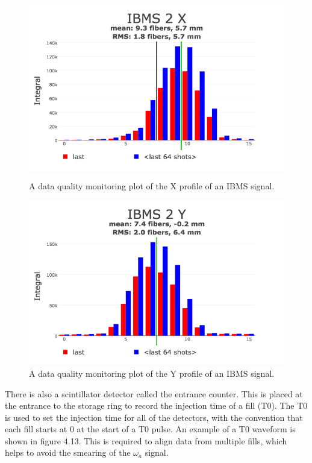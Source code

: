\begin{figure}[!h]
	\centering
	\begin{minipage}[t]{11cm}
		\centering
		\includegraphics[scale=0.5]{Figures/IBMS2_X_DQM.png}
		\caption{A data quality monitoring plot of the X profile of an IBMS signal.}
	\end{minipage}
	\hspace{3cm}
	\begin{minipage}[t]{11cm}
		\centering
		\includegraphics[scale=0.5]{Figures/IBMS2_Y_DQM.png}
		\caption{A data quality monitoring plot of the Y profile of an IBMS signal.}
	\end{minipage}
	\end{figure}

There is also a scintillator detector called the entrance counter. This is placed at the entrance to the storage ring to record the injection time of a fill (T0). The T0 is used to set the injection time for all of the detectors, with the convention that each fill starts at 0 at the start of a T0 pulse. An example of a T0 waveform is shown in figure 4.13. This is required to align data from multiple fills, which helps to avoid the smearing of the $\omega_{a}$ signal\cite{Reference22}.

